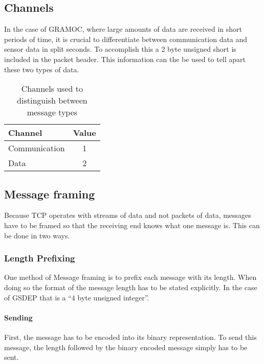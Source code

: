\subsection{Channels}
\label{sec:channels}

In the case of GRAMOC, where large amounts of data are received in short periods of time, it is crucial to differentiate between communication data and sensor data in split seconds. To accomplish this a 2 byte unsigned short is included in the packet header. This information can the be used to tell apart these two types of data.

\begin{table}[H]
	\centering
	\begin{tabular}{| l | c |}
	\hline
	\textbf{Channel} & \textbf{Value} \\ \hline
	Communication & 1 \\ \hline
	Data & 2 \\
	\hline
	\end{tabular}
	\caption{Channels used to distinguish between message types}
	\label{tab:channels}
\end{table}

\subsection{Message framing}
\label{sec:messageframing}
Because TCP operates with streams of data and not packets of data, messages have to be framed so that the receiving end knows what one message is. This can be done in two ways. \cite{MessageFramingCleary,MessageFramingSkotzko}

\subsubsection{Length Prefixing}

One method of Message framing is to prefix each message with its length. When doing so the format of the message length has to be stated explicitly. In the case of GSDEP that is a ``4 byte unsigned integer''.

\paragraph{Sending}

First, the message has to be encoded into its binary representation. To send this message, the length followed by the binary encoded message simply has to be sent.

